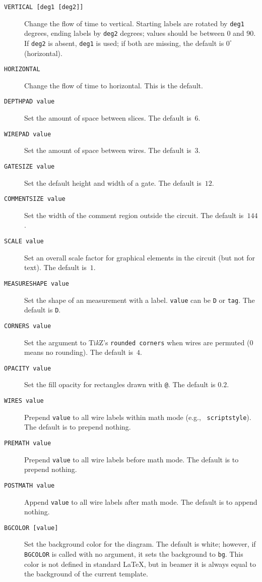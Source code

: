 \documentclass[twoside,12pt]{article}
\newcommand{\TikZ}{Ti\emph{k}Z\xspace}
\begin{document}
\begin{description}
\item[{\tt VERTICAL [deg1 [deg2]]}] Change the flow of time to vertical.  Starting labels are rotated by
{\tt deg1} degrees, ending labels by {\tt deg2} degrees; values should be between $0$ and $90$.  If {\tt deg2}
is absent, {\tt deg1} is used; if both are missing, the default is $0^\circ$ (horizontal).
\item[{\tt HORIZONTAL}] Change the flow of time to horizontal.  This is the default.
\item[{\tt DEPTHPAD value}] Set the amount of space between slices.  The default is~$6$.
\item[{\tt WIREPAD value}] Set the amount of space between wires.  The default is~$3$.
\item[{\tt GATESIZE value}] Set the default height and width of a gate.  The default is~$12$.
\item[{\tt COMMENTSIZE value}] Set the width of the comment region outside the circuit.  The default is~$144$.
\item[{\tt SCALE value}] Set an overall scale factor for graphical elements in the circuit (but not for text).
  The default is~$1$.
\item[{\tt MEASURESHAPE value}] Set the shape of an measurement with a label.  {\tt value}
  can be {\tt D} or {\tt tag}.  The default is {\tt D}.
\item[{\tt CORNERS value}] Set the argument to \TikZ's {\tt rounded corners} when wires
  are permuted ($0$ means no rounding).  The default is~$4$.
\item[{\tt OPACITY value}] Set the fill opacity for rectangles drawn with {\tt @}.
  The default is $0.2$.
\item[{\tt WIRES value}] Prepend {\tt value} to all wire labels within math mode (e.g., {\tt {} scriptstyle}).
The default is to prepend nothing.
\item[{\tt PREMATH value}] Prepend {\tt value} to all wire labels before math mode.  The default is to prepend nothing.
\item[{\tt POSTMATH value}] Append {\tt value} to all wire labels after math mode.  The default is to append nothing.
\item[{\tt BGCOLOR [value]}] Set the background color for the diagram.  The default is white; however, if {\tt BGCOLOR}
is called with no argument, it sets the background to {\tt bg}.  This color is not defined in standard {\LaTeX},
but in {\sc beamer} it is always equal to the background of the current template.

\end{description}
\end{document}
